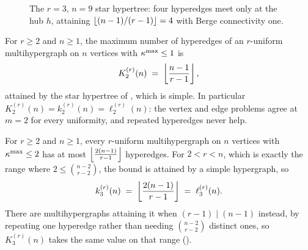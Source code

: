 \begin{figure}[ht]
\centering
{}
\caption{The $r=3$, $n=9$ star hypertree: four hyperedges meet only at the hub $h$, attaining $\left\lfloor (n-1)/(r-1) \right\rfloor=4$ with Berge connectivity one.}
\label{fig:hyper-star}
\end{figure}

\begin{theorem}[Hypergraph vertex value at $m = 2$]\label{thm:hyper-vertex-m2}
For $r \ge 2$ and $n \ge 1$, the maximum number of hyperedges of an
$r$-uniform multihypergraph on $n$ vertices with $\kappa^{\max} \le 1$ is
\[
    K_2^{(r)}(n) \;=\; \left\lfloor \frac{n-1}{r-1} \right\rfloor,
\]
attained by the star hypertree of , which is simple. In
particular $K_2^{(r)}(n) = k_2^{(r)}(n) = \ell_2^{(r)}(n)$: the vertex and edge
problems agree at $m = 2$ for every uniformity, and repeated hyperedges never
help.
\end{theorem}

\begin{theorem}[Hypergraph vertex value at $m = 3$]\label{thm:hyper-vertex-m3}
For $r \ge 2$ and $n\ge1$, every $r$-uniform multihypergraph on $n$ vertices with
$\kappa^{\max} \le 2$ has at most $\left\lfloor \frac{2(n-1)}{r-1} \right\rfloor$ hyperedges. For
$2 < r < n$, which is exactly the range where $2 \le \binom{n-2}{r-2}$, the bound
is attained by a simple hypergraph, so
\[
    k_3^{(r)}(n) \;=\; \left\lfloor \frac{2(n-1)}{r-1} \right\rfloor \;=\; \ell_3^{(r)}(n).
\]
There are multihypergraphs attaining it when $(r-1) \mid (n-1)$ instead, by repeating one
hyperedge rather than needing $\binom{n-2}{r-2}$ distinct ones, so
$K_3^{(r)}(n)$ takes the same value on that range
().
\end{theorem}

